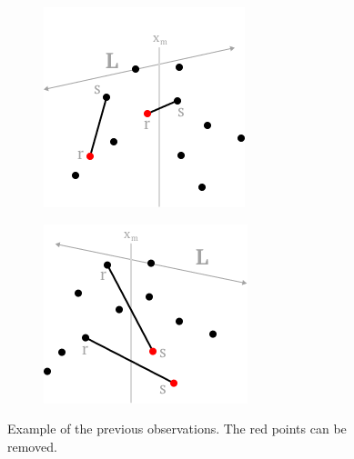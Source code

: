 \documentclass{article}
\begin{document}
\begin{figure}[h]
    \centering
    \begin{subfigure}[b]{.22\linewidth}
        \includegraphics[width=\textwidth]{kirk/kirk_visual_supp_line_a.png}
        \caption{\label{fig:kirk_visual_supp_line_a}}
    \end{subfigure}
    \hspace{14mm}
    \begin{subfigure}[b]{.22\linewidth}
        \includegraphics[width=\textwidth]{kirk/kirk_visual_supp_line_b.png}
        \caption{\label{fig:kirk_visual_supp_line_b}}
    \end{subfigure}
    
    \caption{\label{fig:kirk_visual_supp_line}Example of the previous observations. The red points can be removed.}
\end{figure}
\end{document}
